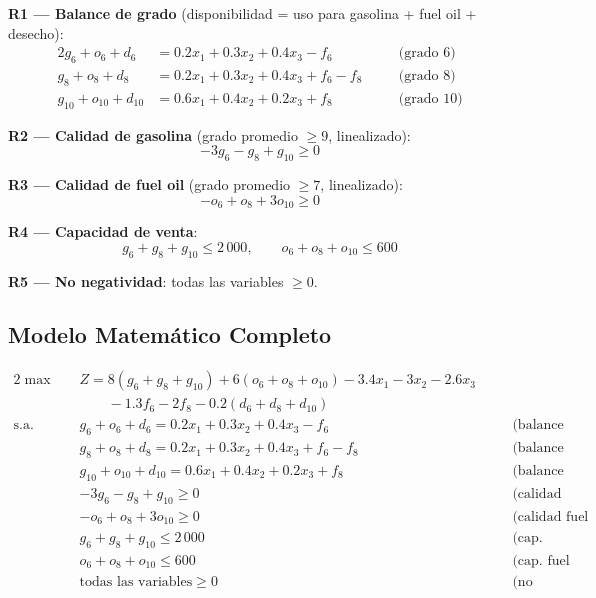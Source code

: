 \documentclass[12pt,a4paper]{article}
\begin{document}
\begin{restbox}
\textbf{R1 — Balance de grado} (disponibilidad = uso para gasolina + fuel oil + desecho):
\begin{alignat*}{2}
  g_6 + o_6 + d_6   &= 0.2x_1 + 0.3x_2 + 0.4x_3 - f_6       &\quad& \text{(grado 6)}\\
  g_8 + o_8 + d_8   &= 0.2x_1 + 0.3x_2 + 0.4x_3 + f_6 - f_8  &\quad& \text{(grado 8)}\\
  g_{10}+o_{10}+d_{10} &= 0.6x_1 + 0.4x_2 + 0.2x_3 + f_8     &\quad& \text{(grado 10)}
\end{alignat*}

\textbf{R2 — Calidad de gasolina} (grado promedio $\geq 9$, linealizado):
\[
  -3g_6 - g_8 + g_{10} \geq 0
\]

\textbf{R3 — Calidad de fuel oil} (grado promedio $\geq 7$, linealizado):
\[
  -o_6 + o_8 + 3o_{10} \geq 0
\]

\textbf{R4 — Capacidad de venta}:
\[
  g_6 + g_8 + g_{10} \leq 2\,000, \qquad o_6 + o_8 + o_{10} \leq 600
\]

\textbf{R5 — No negatividad}: todas las variables $\geq 0$.
\end{restbox}

\subsection{Modelo Matemático Completo}

\begin{modelbox}
\begin{alignat*}{2}
  \max\quad & Z = 8(g_6{+}g_8{+}g_{10}) + 6(o_6{+}o_8{+}o_{10}) - 3.4x_1 - 3x_2 - 2.6x_3\\
            & \qquad - 1.3f_6 - 2f_8 - 0.2(d_6{+}d_8{+}d_{10})\\[4pt]
  \text{s.a.}\quad
  & g_6+o_6+d_6 = 0.2x_1+0.3x_2+0.4x_3-f_6          &\quad& \text{(balance G6)}\\
  & g_8+o_8+d_8 = 0.2x_1+0.3x_2+0.4x_3+f_6-f_8       &\quad& \text{(balance G8)}\\
  & g_{10}+o_{10}+d_{10} = 0.6x_1+0.4x_2+0.2x_3+f_8  &\quad& \text{(balance G10)}\\
  & -3g_6 - g_8 + g_{10} \geq 0                       &\quad& \text{(calidad gasolina)}\\
  & -o_6 + o_8 + 3o_{10} \geq 0                       &\quad& \text{(calidad fuel oil)}\\
  & g_6+g_8+g_{10} \leq 2\,000                        &\quad& \text{(cap.\ gasolina)}\\
  & o_6+o_8+o_{10} \leq 600                            &\quad& \text{(cap.\ fuel oil)}\\
  & \text{todas las variables} \geq 0                  &\quad& \text{(no negatividad)}
\end{alignat*}
\end{modelbox}
\end{document}
